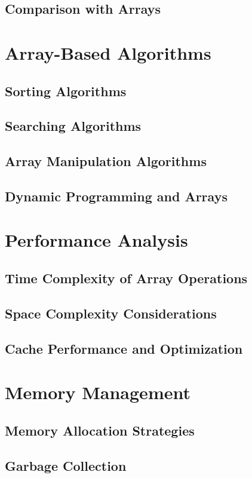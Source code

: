\documentclass[12pt, oneside]{book}
\begin{document}
	\section{Comparison with Arrays}
	
	\chapter{Array-Based Algorithms}
	\section{Sorting Algorithms}
	\section{Searching Algorithms}
	\section{Array Manipulation Algorithms}
	\section{Dynamic Programming and Arrays}
	
	\chapter{Performance Analysis}
	\section{Time Complexity of Array Operations}
	\section{Space Complexity Considerations}
	\section{Cache Performance and Optimization}
	
	\chapter{Memory Management}
	\section{Memory Allocation Strategies}
	\section{Garbage Collection}
\end{document}

